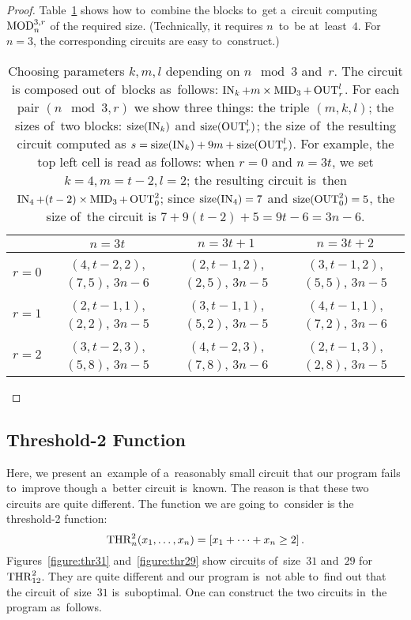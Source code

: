 \begin{proof}
Table~\ref{table:parameters} shows how to~combine
the blocks
to~get a~circuit computing~$\operatorname{MOD}_n^{3,r}$ of the required size. (Technically, it requires $n$~to~be at~least~$4$. For $n=3$, the corresponding circuits are easy to~construct.)

\begin{table}
\begin{center}
\begin{tabular}{cccc}
\toprule
& $n=3t$ & $n=3t+1$ & $n=3t+2$\\
\midrule
$r=0$
& $(4, t-2, 2)$, $(7, 5)$, $3n-6$
& $(2, t-1, 2)$, $(2, 5)$, $3n-5$
& $(3, t-1, 2)$, $(5, 5)$, $3n-5$
\\
$r=1$
& $(2, t-1, 1)$, $(2, 2)$, $3n-5$
& $(3, t-1, 1)$, $(5, 2)$, $3n-5$
& $(4, t-1, 1)$, $(7, 2)$, $3n-6$
\\
$r=2$
& $(3, t-2, 3)$, $(5, 8)$, $3n-5$
& $(4, t-2, 3)$, $(7, 8)$, $3n-6$
& $(2, t-1, 3)$, $(2, 8)$, $3n-5$
\\
\bottomrule
\end{tabular}
\end{center}
\caption{Choosing parameters $k, m, l$ depending on $n \mod 3$ and~$r$. The circuit is composed out of~blocks
as~follows: $\operatorname{IN}_k + m \times \operatorname{MID}_3 + \operatorname{OUT}_r^l$. For each
pair $(n \mod 3, r)$ we show three things: the triple
$(m, k, l)$; the sizes of~two blocks: $\operatorname{size}(\operatorname{IN}_k)$ and $\operatorname{size}(\operatorname{OUT}_r^l)$; the size of~the resulting circuit
computed as $s=\operatorname{size}(\operatorname{IN}_k)+9m+\operatorname{size}(\operatorname{OUT}_r^l)$. For example, the top left cell is read as follows: when $r=0$ and $n=3t$, we set $k=4,m=t-2,l=2$; the resulting circuit 
is~then $\operatorname{IN}_4 + (t-2) \times \operatorname{MID}_3 + \operatorname{OUT}_0^2$; since $\operatorname{size}(\operatorname{IN}_4)=7$ and $\operatorname{size}(\operatorname{OUT}_0^2)=5$, the size of~the circuit is $7+9(t-2)+5=9t-6=3n-6$.}
\label{table:parameters}
\end{table}
\end{proof}

\subsection{Threshold-2 Function}
Here, we present an~example of a~reasonably small circuit
that our program fails to~improve though a~better circuit
is~known. The reason is that these two circuits are quite
different. The function we are going to~consider is the threshold-2 function:
\[\operatorname{THR}_n^2(x_1, \dotsc, x_n)=[x_1+\dotsb+x_n \ge 2] \, .\]
Figures~\ref{figure:thr31} and~\ref{figure:thr29} show circuits of~size~$31$ and~$29$ for $\operatorname{THR}_{12}^2$.
They are 
quite different and our program is~not able to~find out 
that the circuit 
of~size~$31$ is~suboptimal.
One can construct the two circuits in~the program as~follows.

